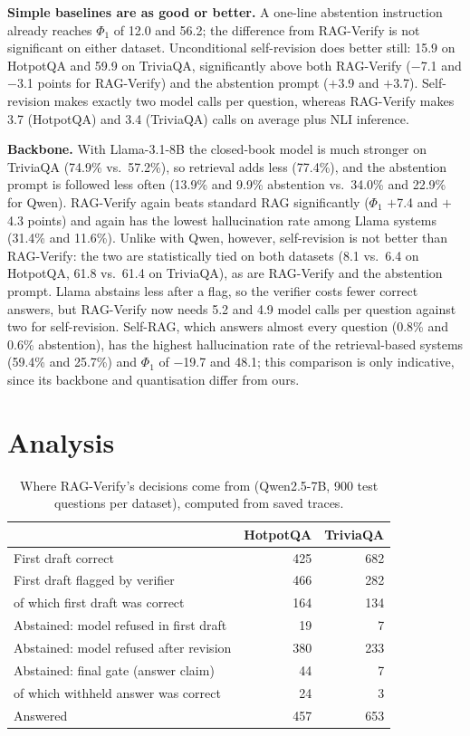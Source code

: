 \documentclass[conference]{IEEEtran}
\begin{document}
\textbf{Simple baselines are as good or better.} A one-line abstention instruction already reaches $\Phi_1$ of 12.0 and 56.2; the difference from RAG-Verify is not significant on either dataset. Unconditional self-revision does better still: 15.9 on HotpotQA and 59.9 on TriviaQA, significantly above both RAG-Verify ($-$7.1 and $-$3.1 points for RAG-Verify) and the abstention prompt ($+$3.9 and $+$3.7). Self-revision makes exactly two model calls per question, whereas RAG-Verify makes 3.7 (HotpotQA) and 3.4 (TriviaQA) calls on average plus NLI inference.

\textbf{Backbone.} With Llama-3.1-8B the closed-book model is much stronger on TriviaQA (74.9\% vs.\ 57.2\%), so retrieval adds less (77.4\%), and the abstention prompt is followed less often (13.9\% and 9.9\% abstention vs.\ 34.0\% and 22.9\% for Qwen). RAG-Verify again beats standard RAG significantly ($\Phi_1$ $+$7.4 and $+$4.3 points) and again has the lowest hallucination rate among Llama systems (31.4\% and 11.6\%). Unlike with Qwen, however, self-revision is not better than RAG-Verify: the two are statistically tied on both datasets (8.1 vs.\ 6.4 on HotpotQA, 61.8 vs.\ 61.4 on TriviaQA), as are RAG-Verify and the abstention prompt. Llama abstains less after a flag, so the verifier costs fewer correct answers, but RAG-Verify now needs 5.2 and 4.9 model calls per question against two for self-revision. Self-RAG, which answers almost every question (0.8\% and 0.6\% abstention), has the highest hallucination rate of the retrieval-based systems (59.4\% and 25.7\%) and $\Phi_1$ of $-$19.7 and 48.1; this comparison is only indicative, since its backbone and quantisation differ from ours.

\section{Analysis}
\begin{table}[t]
\centering
\caption{Where RAG-Verify's decisions come from (Qwen2.5-7B, 900 test questions per dataset), computed from saved traces.}
\label{tab:trace}
\begin{tabular}{lrr}
\toprule
 & HotpotQA & TriviaQA \\
\midrule
First draft correct & 425 & 682 \\
First draft flagged by verifier & 466 & 282 \\
\quad of which first draft was correct & 164 & 134 \\
Abstained: model refused in first draft & 19 & 7 \\
Abstained: model refused after revision & 380 & 233 \\
Abstained: final gate (answer claim) & 44 & 7 \\
\quad of which withheld answer was correct & 24 & 3 \\
Answered & 457 & 653 \\
\bottomrule
\end{tabular}
\end{table}
\end{document}
